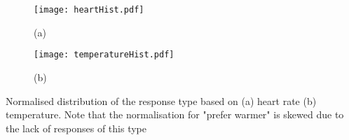     \begin{subfigure}[t]{0.49\textwidth}  
    \centering
	\texttt{[image: heartHist.pdf]}
	\caption{(a)}
	\label{fig:heartHist}
    \end{subfigure}
    \begin{subfigure}[t]{0.49\textwidth}
    \centering
		\texttt{[image: temperatureHist.pdf]}
		\caption{(b)}
		\label{fig:tempHist}	
    \end{subfigure}
    \caption{ Normalised distribution of the response type based on (a) heart rate (b) temperature. Note that the normalisation for "prefer warmer" is skewed due to the lack of responses of this type}



\subsection{}



